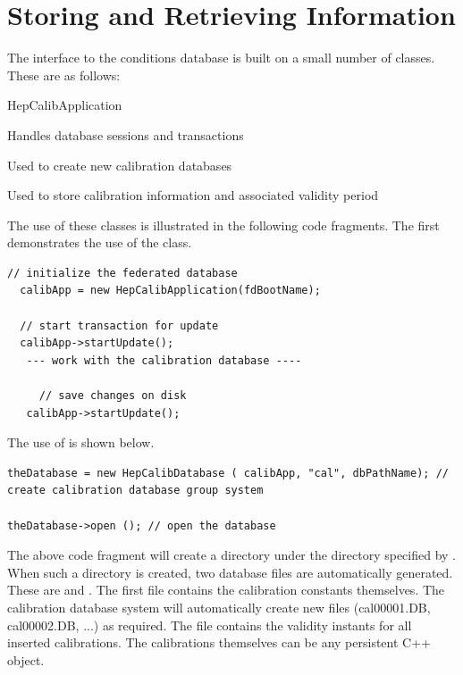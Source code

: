 \section{Storing and Retrieving Information}

\par

The interface to the conditions database is built on a small number of classes. These are as 
follows:\begin{DLtt}{HepCalibApplication}
\item[HepCalibApplication]Handles database sessions and transactions
\item[HepCalibDatabase]Used to create new calibration databases
\item[calibInterval]Used to store calibration information and associated validity period
\end{DLtt}

\par

The use of these classes is illustrated in the following code fragments.
The first demonstrates the use of the  class.
\begin{verbatim}
// initialize the federated database 
  calibApp = new HepCalibApplication(fdBootName); 
  
  // start transaction for update 
  calibApp->startUpdate(); 
   --- work with the calibration database ---- 

     // save changes on disk 
   calibApp->startUpdate();
\end{verbatim}

\par

The use of  is shown below.
\begin{verbatim}
theDatabase = new HepCalibDatabase ( calibApp, "cal", dbPathName); // create calibration database group system 

theDatabase->open (); // open the database
\end{verbatim}

\par

The above code fragment will create a directory  under the directory
specified by . When such a directory is created, two database
files are automatically generated. These are  and .
The first file contains the calibration constants themselves. The calibration database system
will automatically create new files (cal00001.DB, cal00002.DB, ...) as required. The file
 contains the validity instants for all inserted calibrations.
The calibrations themselves can be any persistent C++ object.

